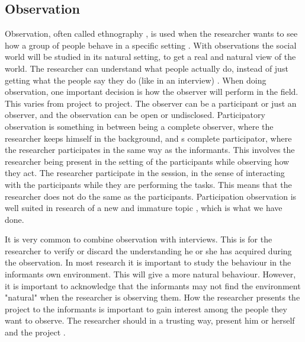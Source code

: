 \subsection{Observation}
Observation, often called ethnography \cite{tjora}, is used when the researcher wants to see how a group of people behave in a specific setting \cite{qualitative}. With observations the social world will be studied in its natural setting, to get a real and natural view of the world. The researcher can understand what people actually do, instead of just getting what the people say they do (like in an interview) \cite{tjora}. When doing observation, one important decision is how the observer will perform in the field. This varies from project to project. The observer can be a participant or just an observer, and the observation can be open or undisclosed. Participatory observation is something in between being a complete observer, where the researcher keeps himself in the background, and s complete participator, where the researcher participates in the same way as the informants. This involves the researcher being present in the setting of the participants while observing how they act. The researcher participate in the session, in the sense of interacting with the participants while they are performing the tasks. This means that the researcher does not do the same as the participants. Participation observation is well suited in research of a new and immature topic \cite{qualitative}, which is what we have done.

It is very common to combine observation with interviews. This is for the researcher to verify or discard the understanding he or she has acquired during the observation. In most research it is important to study the behaviour in the informants own environment. This will give a more natural behaviour. However, it is important to acknowledge that the informants may not find the environment "natural" when the researcher is observing them. How the researcher presents the project to the informants is important to gain interest among the people they want to observe. The researcher should in a trusting way, present him or herself and the project \cite{qualitative}.

